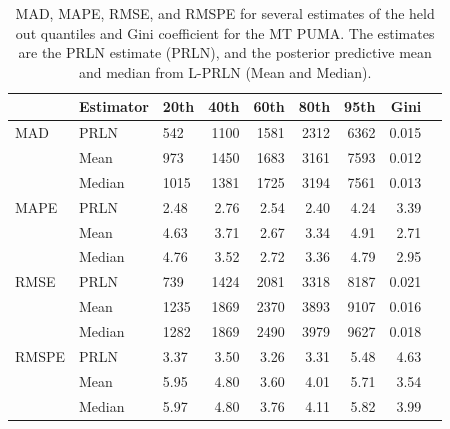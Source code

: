 \documentclass[12pt]{article}
\begin{document}
\begin{table}[ht]
  \centering
  \begin{tabular}{lllrrrrrr}
    \hline
            & Estimator & 20th & 40th & 60th & 80th & 95th & Gini \\
    \hline
    MAD     & PRLN          & 542   & 1100 & 1581 & 2312 & 6362  & 0.015 \\
            & Mean          & 973   & 1450 & 1683 & 3161 & 7593  & 0.012 \\
            & Median        & 1015  & 1381 & 1725 & 3194 & 7561  & 0.013 \\
    MAPE    & PRLN          & 2.48  & 2.76 & 2.54 & 2.40 & 4.24  & 3.39 \\
            & Mean          & 4.63  & 3.71 & 2.67 & 3.34 & 4.91  & 2.71 \\
            & Median        & 4.76  & 3.52 & 2.72 & 3.36 & 4.79  & 2.95 \\
    RMSE    & PRLN          & 739   & 1424 & 2081 & 3318 & 8187  & 0.021 \\
            & Mean          & 1235  & 1869 & 2370 & 3893 & 9107  & 0.016 \\
            & Median        & 1282  & 1869 & 2490 & 3979 & 9627  & 0.018 \\
    RMSPE   & PRLN          & 3.37  & 3.50 & 3.26 & 3.31 & 5.48  & 4.63 \\
            & Mean          & 5.95  & 4.80 & 3.60 & 4.01 & 5.71  & 3.54 \\
            & Median        & 5.97  & 4.80 & 3.76 & 4.11 & 5.82  & 3.99 \\
    \hline
  \end{tabular}
  \caption{MAD, MAPE, RMSE, and RMSPE for several estimates of the held out quantiles and Gini coefficient for the MT PUMA. The estimates are the PRLN estimate (PRLN), and the posterior predictive mean and median from L-PRLN (Mean and Median).}
  \label{tab:mt.metric}
\end{table}
\end{document}
